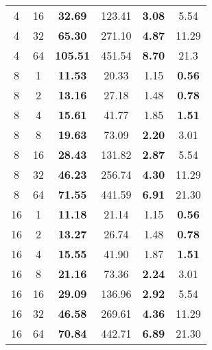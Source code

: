 \begin{table}[!ht]
\begin{tabular}{@{}cccccc@{}}
		4 & 16 & \textbf{32.69} & 123.41 & \textbf{3.08} & 5.54 \\ 
		4 & 32 & \textbf{65.30} & 271.10 & \textbf{4.87} & 11.29 \\ 
		4 & 64 & \textbf{105.51} & 451.54 & \textbf{8.70} & 21.3 \\ \midrule
		8 & 1 & \textbf{11.53} & 20.33 & 1.15 & \textbf{0.56} \\ 
		8 & 2 & \textbf{13.16} & 27.18 & 1.48 & \textbf{0.78} \\ 
		8 & 4 & \textbf{15.61} & 41.77 & 1.85 & \textbf{1.51} \\ 
		8 & 8 & \textbf{19.63} & 73.09 & \textbf{2.20} & 3.01 \\ 
		8 & 16 & \textbf{28.43} & 131.82 & \textbf{2.87} & 5.54 \\ 
		8 & 32 & \textbf{46.23} & 256.74 & \textbf{4.30} & 11.29 \\ 
		8 & 64 & \textbf{71.55} & 441.59 & \textbf{6.91} & 21.30 \\ \midrule
		16 & 1 & \textbf{11.18} & 21.14 & 1.15 & \textbf{0.56} \\ 
		16 & 2 & \textbf{13.27} & 26.74 & 1.48 & \textbf{0.78} \\ 
		16 & 4 & \textbf{15.55} & 41.90 & 1.87 & \textbf{1.51} \\ 
		16 & 8 & \textbf{21.16} & 73.36 & \textbf{2.24} & 3.01 \\ 
		16 & 16 & \textbf{29.09} & 136.96 & \textbf{2.92} & 5.54 \\ 
		16 & 32 & \textbf{46.58} & 269.61 & \textbf{4.36} & 11.29 \\ 
		16 & 64 & \textbf{70.84} & 442.71 & \textbf{6.89} & 21.30 \\ \bottomrule
	\end{tabular}
\end{table}